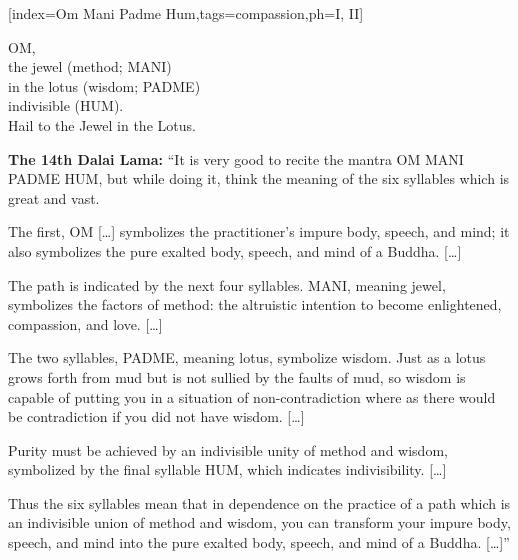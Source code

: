 [index={Om Mani Padme Hum},tags={compassion},ph={I, II}]
  {\small{} }
  \vspace{-2em}
  \begin{feeler}
    OM,\\
    the jewel (method; MANI)\\
    in the lotus (wisdom; PADME)\\
    indivisible (HUM).\\\vspace{1em}
    Hail to the Jewel in the Lotus.
  \end{feeler}
  \begin{explanation}
    \textbf{The 14th Dalai Lama:} ``It is very good to recite the mantra OM MANI PADME HUM, but
    while doing it, think the meaning of the six syllables which is great and vast.\par
    The first, OM [\ldots] symbolizes the practitioner's impure body, speech, and mind; it also
    symbolizes the pure exalted body, speech, and mind of a Buddha. [\ldots]\par
    The path is indicated by the next four syllables. MANI, meaning jewel, symbolizes the
    factors of method: the altruistic intention to become enlightened, compassion, and
    love. [\ldots]\par
    The two syllables, PADME, meaning lotus, symbolize wisdom. Just as a lotus grows forth
    from mud but is not sullied by the faults of mud, so wisdom is capable of putting you in
    a situation of non-contradiction where as there would be contradiction if you did not have
    wisdom. [\ldots]\par
    Purity must be achieved by an indivisible unity of method and wisdom, symbolized by the
    final syllable HUM, which indicates indivisibility. [\ldots]\par
    Thus the six syllables mean that in dependence on the practice of a path which is an
    indivisible union of method and wisdom, you can transform your impure body, speech, and
    mind into the pure exalted body, speech, and mind of a Buddha. [\ldots]''
  \end{explanation}
\endsong


